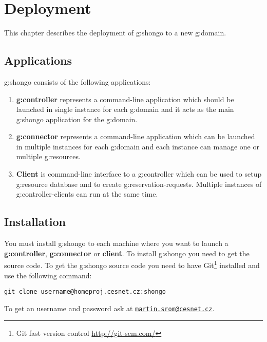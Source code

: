 \chapter{Deployment}

This chapter describes the deployment of \gls{g:shongo} to a new \gls{g:domain}.

\section{Applications}

\Gls{g:shongo} consists of the following applications:
\begin{enumerate}
\item \textbf{\Gls{g:controller}} represents a command-line application which should be launched in single instance for each \gls{g:domain} and it acts as the main \gls{g:shongo} application for the \gls{g:domain}.
\item \textbf{\Gls{g:connector}} represents a command-line application which can be launched in multiple instances for each \gls{g:domain} and each instance can manage one or multiple \glspl{g:resource}.
\item \textbf{Client} is command-line interface to a \gls{g:controller} which can be used to setup \gls{g:resource} database and to create \glspl{g:reservation-request}. Multiple instances of \glspl{g:controller-client} can run at the same time.
\end{enumerate}

\section{Installation}

You must install \gls{g:shongo} to each machine where you want to launch a \textbf{\gls{g:controller}}, \textbf{\gls{g:connector}} or \textbf{client}. To install \gls{g:shongo} you need to get the source code. To get the \gls{g:shongo} source code you need to have Git\footnote{Git fast version control \url{http://git-scm.com/}} installed and use the following command:
\begin{verbatim}
git clone username@homeproj.cesnet.cz:shongo
\end{verbatim}
To get an username and password ask at \href{mailto:martin.srom@cesnet.cz}{\texttt{martin.srom@cesnet.cz}}. 

